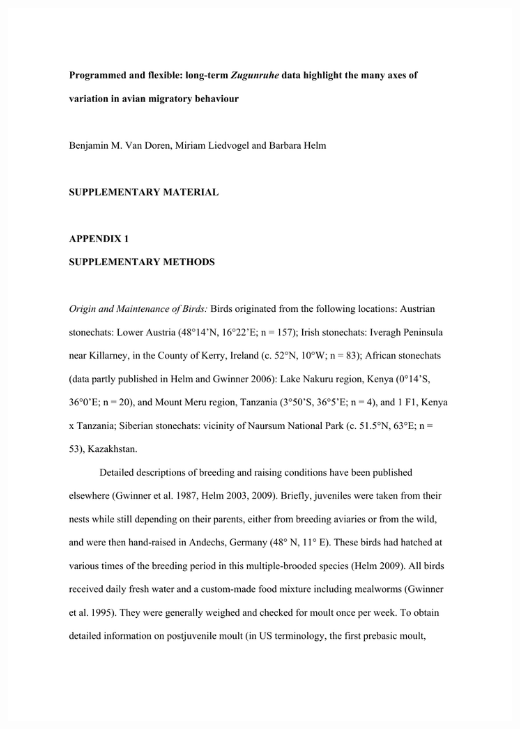 \documentclass[a4paper, twoside]{templates/ociamthesis}
\begin{document}
\includegraphics[width=1\linewidth]{pdf_chapters/zug/zug_supp_crop_Part02}
\end{document}
